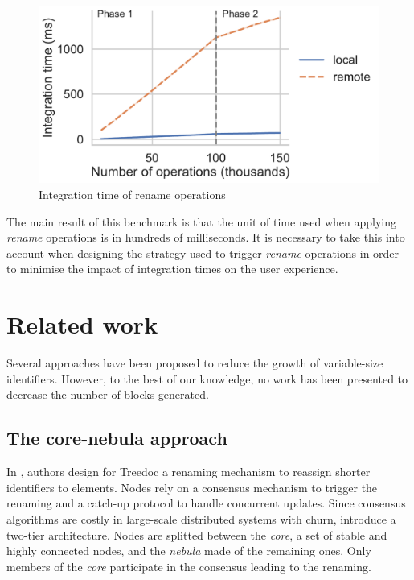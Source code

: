 \documentclass[sigplan,10pt,authorversion]{acmart}
\begin{document}
\begin{figure}[ht!]
    \centering
    \includegraphics[width=0.9\columnwidth]{img/integration-time-rename.pdf}
    \caption{Integration time of rename operations}
    \label{fig:evolution-integration-time-rename}
\end{figure}

The main result of this benchmark is that the unit of time used when applying \emph{rename} operations is in hundreds of milliseconds.
It is necessary to take this into account when designing the strategy used to trigger \emph{rename} operations in order to minimise the impact of integration times on the user experience.


\section{Related work}

\label{sec:related-work}

Several approaches have been proposed to reduce the growth of variable-size identifiers.
However, to the best of our knowledge, no work has been presented to decrease the number of blocks generated.

\subsection{The core-nebula approach}

In \cite{letia:hal-01248270,zawirski:hal-01248197}, authors design for Treedoc \cite{5158449} a renaming mechanism to reassign shorter identifiers to elements.
Nodes rely on a consensus mechanism to trigger the renaming and a catch-up protocol to handle concurrent updates.
Since consensus algorithms are costly in large-scale distributed systems with churn, \citet{letia:hal-01248270} introduce a two-tier architecture.
Nodes are splitted between the \emph{core}, a set of stable and highly connected nodes, and the \emph{nebula} made of the remaining ones.
Only members of the \emph{core} participate in the consensus leading to the renaming.
\end{document}
